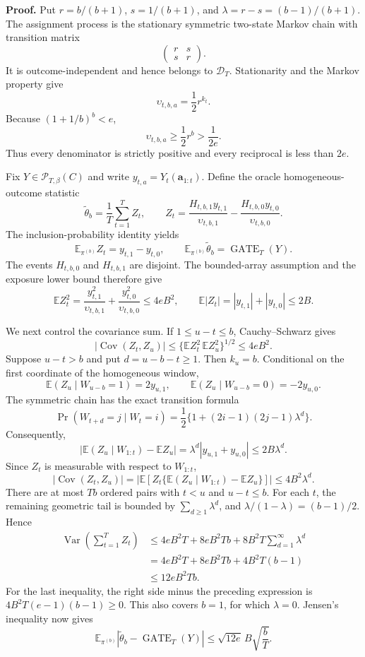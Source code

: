 \textbf{Proof.} Put \(r=b/(b+1)\), \(s=1/(b+1)\), and \(\lambda=r-s=(b-1)/(b+1)\). The assignment process is the stationary symmetric two-state Markov chain with transition matrix
\[
\begin{pmatrix}r&s\\s&r\end{pmatrix}.
\]
It is outcome-independent and hence belongs to \(\mathcal D_T\). Stationarity and the Markov property give
\[
\upsilon_{t,b,a}=\frac12r^{k_t}.
\]
Because \((1+1/b)^b<e\),
\[
\upsilon_{t,b,a}\ge\frac12r^b>\frac1{2e}.
\]
Thus every denominator is strictly positive and every reciprocal is less than \(2e\).

Fix \(Y\in\mathcal P_{T,\beta}(C)\) and write \(y_{t,a}=Y_t(\mathbf a_{1:t})\). Define the oracle homogeneous-outcome statistic
\[
\widetilde\theta_b=\frac1T\sum_{t=1}^T Z_t,
\qquad
Z_t=\frac{H_{t,b,1}y_{t,1}}{\upsilon_{t,b,1}}-
\frac{H_{t,b,0}y_{t,0}}{\upsilon_{t,b,0}}.
\]
The inclusion-probability identity yields
\[
\mathbb E_{\pi^{(b)}}Z_t=y_{t,1}-y_{t,0},
\qquad
\mathbb E_{\pi^{(b)}}\widetilde\theta_b=\operatorname{GATE}_T(Y).
\]
The events \(H_{t,b,0}\) and \(H_{t,b,1}\) are disjoint. The bounded-array assumption and the exposure lower bound therefore give
\[
\mathbb E Z_t^2
=\frac{y_{t,1}^2}{\upsilon_{t,b,1}}+
\frac{y_{t,0}^2}{\upsilon_{t,b,0}}
\le4eB^2,
\qquad
\mathbb E|Z_t|=|y_{t,1}|+|y_{t,0}|\le2B.
\]

We next control the covariance sum. If \(1\le u-t\le b\), Cauchy--Schwarz gives
\[
|\operatorname{Cov}(Z_t,Z_u)|
\le\{\mathbb E Z_t^2\,\mathbb E Z_u^2\}^{1/2}
\le4eB^2.
\]
Suppose \(u-t>b\) and put \(d=u-b-t\ge1\). Then \(k_u=b\). Conditional on the first coordinate of the homogeneous window,
\[
\mathbb E(Z_u\mid W_{u-b}=1)=2y_{u,1},
\qquad
\mathbb E(Z_u\mid W_{u-b}=0)=-2y_{u,0}.
\]
The symmetric chain has the exact transition formula
\[
\Pr(W_{t+d}=j\mid W_t=i)
=\frac12\{1+(2i-1)(2j-1)\lambda^d\}.
\]
Consequently,
\[
\left|\mathbb E(Z_u\mid W_{1:t})-\mathbb EZ_u\right|
=\lambda^d|y_{u,1}+y_{u,0}|
\le2B\lambda^d.
\]
Since \(Z_t\) is measurable with respect to \(W_{1:t}\),
\[
|\operatorname{Cov}(Z_t,Z_u)|
=\left|\mathbb E\left[Z_t\{\mathbb E(Z_u\mid W_{1:t})-\mathbb EZ_u\}\right]\right|
\le4B^2\lambda^d.
\]
There are at most \(Tb\) ordered pairs with \(t<u\) and \(u-t\le b\). For each \(t\), the remaining geometric tail is bounded by \(\sum_{d\ge1}\lambda^d\), and \(\lambda/(1-\lambda)=(b-1)/2\). Hence
\[
\begin{aligned}
\operatorname{Var}\left(\sum_{t=1}^T Z_t\right)
&\le4eB^2T+8eB^2Tb+8B^2T\sum_{d=1}^{\infty}\lambda^d\\
&=4eB^2T+8eB^2Tb+4B^2T(b-1)\\
&\le12eB^2Tb.
\end{aligned}
\]
For the last inequality, the right side minus the preceding expression is \(4B^2T(e-1)(b-1)\ge0\). This also covers \(b=1\), for which \(\lambda=0\). Jensen's inequality now gives
\[
\mathbb E_{\pi^{(b)}}
\left|\widetilde\theta_b-\operatorname{GATE}_T(Y)\right|
\le\sqrt{12e}\,B\sqrt{\frac bT}.
\]

